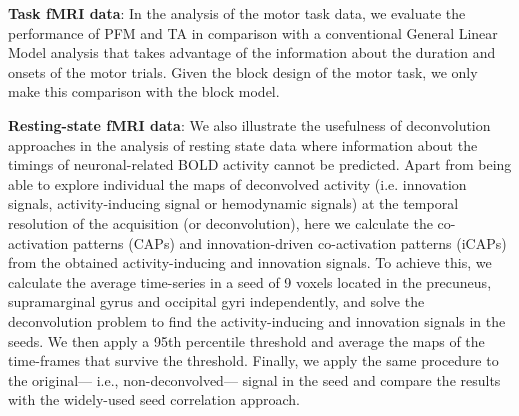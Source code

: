 \textbf{Task fMRI data}: In the analysis of the motor task data, we evaluate the performance of PFM and TA in comparison with a conventional General Linear Model analysis that takes advantage of the information about the duration and onsets of the motor trials. Given the block design of the motor task, we only make this comparison with the block model.

\textbf{Resting-state fMRI data}: We also illustrate the usefulness of deconvolution approaches in the analysis of resting state data where information about the timings of neuronal-related BOLD activity cannot be predicted. Apart from being able to explore individual the maps of deconvolved activity (i.e. innovation signals, activity-inducing signal or hemodynamic signals) at the temporal resolution of the acquisition (or deconvolution), here we calculate the co-activation patterns (CAPs) and innovation-driven co-activation patterns (iCAPs) from the obtained activity-inducing and innovation signals. To achieve this, we calculate the average time-series in a seed of 9 voxels located in the precuneus, supramarginal gyrus and occipital gyri independently, and solve the deconvolution problem to find the activity-inducing and innovation signals in the seeds. We then apply a 95th percentile threshold and average the maps of the time-frames that survive the threshold. Finally, we apply the same procedure to the original--- i.e., non-deconvolved--- signal in the seed and compare the results with the widely-used seed correlation approach.